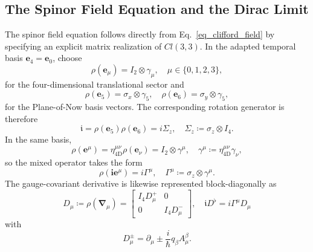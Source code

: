\subsection{The Spinor Field Equation and the Dirac Limit}
\label{ch_spinor_matrix_representation}
The spinor field equation follows directly from Eq.~\eqref{eq_clifford_field} by specifying an explicit matrix realization of $Cl(3,3)$. In the adapted temporal basis $\mathbf{e}_{4} = \mathbf{e}_{0}$, choose
\begin{equation}
    \rho(\mathbf{e}_{\mu}) = I_{2} \otimes \gamma_{\mu},\quad \mu \in \{0, 1, 2, 3\},
\end{equation}
for the four-dimensional translational sector and
\begin{equation}
    \rho(\mathbf{e}_{5}) = \sigma_{x} \otimes \gamma_{5},\quad \rho(\mathbf{e}_{6}) = \sigma_{y} \otimes \gamma_{5},
\end{equation}
for the Plane-of-Now basis vectors. The corresponding rotation generator is therefore
\begin{equation}
    \mathfrak{i} = \rho(\mathbf{e}_{5})\rho(\mathbf{e}_{6}) = i\Sigma_{z},\quad \Sigma_{z} \coloneqq \sigma_{z} \otimes I_{4}.
\end{equation}
In the same basis,
\begin{equation}
    \rho(\mathbf{e}^{\mu}) = \eta_{\mathrm{4D}}^{\mu\nu}\rho(\mathbf{e}_{\nu}) = I_{2} \otimes \gamma^{\mu},\quad \gamma^{\mu} \coloneqq \eta_{\mathrm{4D}}^{\mu\nu}\gamma_{\nu},
\end{equation}
so the mixed operator takes the form
\begin{equation}\label{eq_spinor_gamma_definition}
    \rho(\mathbf{i}\mathbf{e}^{\mu}) = i\Gamma^{\mu},\quad \Gamma^{\mu} \coloneqq \sigma_{z} \otimes \gamma^{\mu}.
\end{equation}
The gauge-covariant derivative is likewise represented block-diagonally as
\begin{equation}\label{eq_spinor_covariant_derivative}
    D_{\mu} \coloneqq \rho(\boldsymbol{\nabla}_{\mu}) = \begin{bmatrix}I_{4}D_{\mu}^{+} & 0 \\ 0 & I_{4}D_{\mu}^{-}\end{bmatrix},\quad \mathfrak{i}D^{\flat} = i\Gamma^{\mu}D_{\mu}
\end{equation}
with
\begin{equation}\label{eq_sector_covariant_derivatives}
    D_{\mu}^{\pm} = \partial_{\mu} \pm \frac{i}{\hbar}q_{\beta}A_{\mu}^{\beta}.
\end{equation}
